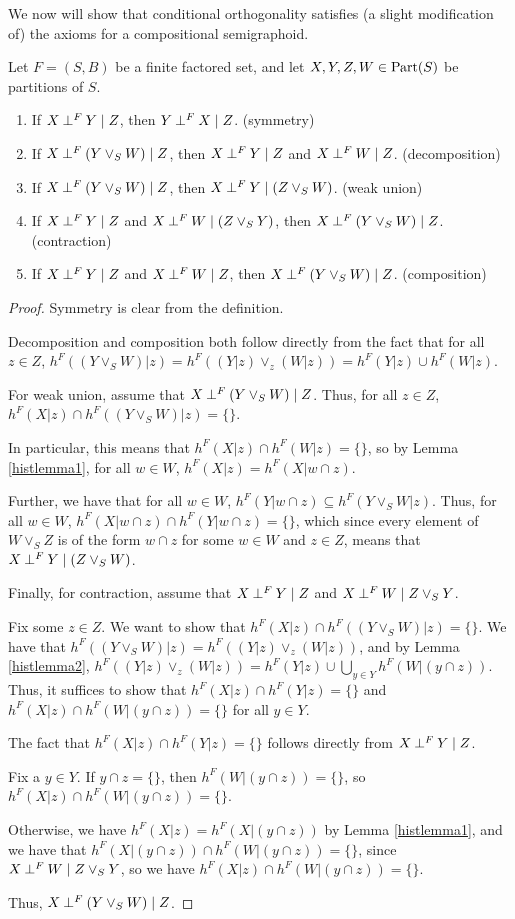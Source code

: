 \documentclass[authordate,onecolumn]{miri-tech-article}
\begin{document}
We now will show that conditional orthogonality satisfies (a slight modification of) the axioms for a compositional semigraphoid. 
\begin{theorem}\label{semigraphoid}
Let $F=(S,B)$ be a finite factored set, and let $X,Y,Z,W\in \text{Part}(S)$ be partitions of $S$.
\begin{enumerate}
    \item If $X\mathbin{\perp^{F}}Y\mid Z$, then $Y\mathbin{\perp^{F}}X\mid Z$. (symmetry)
    \item If $X\mathbin{\perp^{F}}(Y\vee_S W)\mid Z$, then $X\mathbin{\perp^{F}}Y\mid Z$ and $X\mathbin{\perp^{F}}W\mid Z$. (decomposition)
    \item If $X\mathbin{\perp^{F}}(Y\vee_S W)\mid Z$, then $X\mathbin{\perp^{F}}Y\mid (Z\vee_S W)$. (weak union)
    \item If $X\mathbin{\perp^{F}}Y\mid Z$ and $X\mathbin{\perp^{F}}W\mid (Z\vee_S Y)$, then $X\mathbin{\perp^{F}}(Y\vee_S W)\mid Z$. (contraction)
    \item If $X\mathbin{\perp^{F}}Y\mid Z$ and $X\mathbin{\perp^{F}}W\mid Z$, then $X\mathbin{\perp^{F}}(Y\vee_S W)\mid Z$. (composition)
\end{enumerate}
\end{theorem}
\begin{proof}
Symmetry is clear from the definition.

Decomposition and composition both follow directly from the fact that for all $z\in Z$, $h^F((Y\vee_S W)|z)=h^F((Y|z)\vee_z (W|z))=h^F(Y|z)\cup h^F(W|z)$.

For weak union, assume that $X\mathbin{\perp^{F}}(Y\vee_S W)\mid Z$. Thus, for all $z\in Z$, $h^F(X|z)\cap h^F((Y\vee_S W)|z)=\{\}$.

In particular, this means that $h^F(X|z)\cap h^F(W|z)=\{\}$, so by Lemma \ref{histlemma1}, for all $w\in W$, $h^F(X|z)=h^F(X|w\cap z)$.

Further, we have that for all $w\in W$, $h^F(Y|w\cap z)\subseteq h^F(Y \vee_S W|z)$. Thus, for all $w\in W$, $h^F(X|w\cap z)\cap h^F(Y|w\cap z)=\{\}$, which since every element of $W\vee_S Z$ is of the form $w\cap z$ for some $w\in W$ and $z\in Z$, means that $X\mathbin{\perp^{F}}Y\mid (Z\vee_S W)$.

Finally, for contraction, assume that $X\mathbin{\perp^{F}}Y\mid Z$ and $X\mathbin{\perp^{F}}W\mid Z\vee_S Y$.

Fix some $z\in Z$. We want to show that $h^F(X|z)\cap h^F((Y\vee_S W)|z)=\{\}$. We have that $h^F((Y\vee_S W)|z)=h^F((Y|z)\vee_z (W|z))$, and by Lemma \ref{histlemma2}, $h^F((Y|z)\vee_z (W|z))=h^F(Y|z)\cup\bigcup_{y\in Y}h^F(W|(y\cap z))$. Thus, it suffices to show that $h^F(X|z)\cap h^F(Y|z)=\{\}$ and $h^F(X|z)\cap h^F(W|(y\cap z))=\{\}$ for all $y\in Y$.


The fact that $h^F(X|z)\cap h^F(Y|z)=\{\}$ follows directly from $X\mathbin{\perp^{F}}Y\mid Z$. 

Fix a $y\in Y$. If $y\cap z=\{\}$, then $h^F(W|(y\cap z))=\{\}$, so $h^F(X|z)\cap h^F(W|(y\cap z))=\{\}$.

Otherwise, we have $h^F(X|z)=h^F(X|(y\cap z))$ by Lemma \ref{histlemma1}, and we have that $h^F(X|(y\cap z))\cap h^F(W|(y\cap z))=\{\}$, since $X\mathbin{\perp^{F}}W\mid Z\vee_S Y$, so we have $h^F(X|z)\cap h^F(W|(y\cap z))=\{\}$. 

Thus, $X\mathbin{\perp^{F}}(Y\vee_S W)\mid Z$.
\end{proof}
\end{document}
